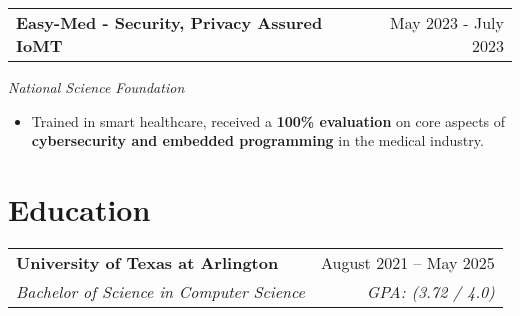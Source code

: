 \documentclass[a4paper,12pt]{article}
\begin{document}
\begin{tabularx}{\linewidth}{@{}Xr@{}}
\textbf{Easy-Med - Security, Privacy Assured IoMT} & \hfill May 2023 - July 2023
\end{tabularx}
\textit{National Science Foundation}
\vspace{-0.4em}
\begin{itemize}
    \item Trained in smart healthcare, received a \textbf{100\% evaluation} on core aspects of \textbf{cybersecurity and embedded programming} in the medical industry.
\end{itemize}

\vspace{-0.3em}
\section{Education}
\noindent
\begin{tabularx}{\linewidth}{@{}Xr@{}}
\textbf{University of Texas at Arlington} & August 2021 -- May 2025 \\
\textit{Bachelor of Science in Computer Science} & \textit{GPA: (3.72 / 4.0)} \\
\end{tabularx}

\vfill
\end{document}
